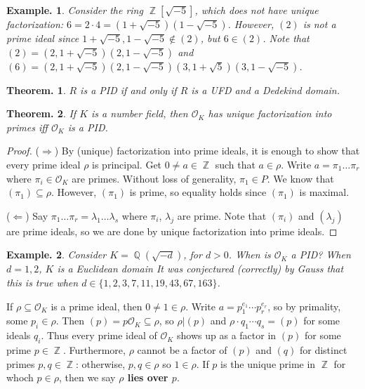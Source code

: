 \documentclass[11pt, a4paper]{memoir}
\DeclareMathOperator{\Q}{{\mathbb{Q}}}
\DeclareMathOperator{\Z}{{\mathbb{Z}}}
\theoremstyle{change}
\newtheorem{theorem}{Theorem.}[section]
\theoremstyle{plain}
\theoremstyle{nonumberplain}
\newtheorem{example}{Example.}
\newtheorem{proof}{Proof}
\numberwithin{equation}{section}
\begin{document}
\begin{example}
    Consider the ring $\Z[\sqrt{-5}]$, which does not have unique factorization: $6=2\cdot 4=(1+\sqrt{-5})(1-\sqrt{-5})$.
    However, $(2)$ is not a prime ideal since $1+\sqrt{-5},1-\sqrt{-5}\notin(2)$, but $6\in(2)$.
    Note that $(2)=(2,1+\sqrt{-5})(2,1-\sqrt{-5})$ and $(6)=(2,1+\sqrt{-5})(2,1-\sqrt{-5})(3,1+\sqrt{5})(3,1-\sqrt{-5})$.
\end{example}
\begin{theorem}
    $R$ is a PID if and only if $R$ is a UFD and a Dedekind domain.
\end{theorem}
\begin{theorem}
    If $K$ is a number field, then $\mathcal{O}_K$ has unique factorization into primes iff $\mathcal{O}_K$ is a PID.
\end{theorem}
\begin{proof}
    ($\Rightarrow$) By (unique) factorization into prime ideals, it is enough to show that every prime ideal $\rho$ is principal.
    Get $0\neq a\in\Z$ such that $a\in\rho$.
    Write $a=\pi_1\ldots\pi_r$ where $\pi_i\in\mathcal{O}_K$ are primes.
    Without loss of generality, $\pi_1\in P$.
    We know that $(\pi_1)\subseteq\rho$.
    However, $(\pi_1)$ is prime, so equality holds since $(\pi_1)$ is maximal.

    ($\Leftarrow$) Say $\pi_1\ldots\pi_r=\lambda_1\ldots\lambda_s$ where $\pi_i$, $\lambda_j$ are prime.
    Note that $(\pi_i)$ and $(\lambda_j)$ are prime ideals, so we are done by unique factorization into prime ideals.
\end{proof}
\begin{example}
    Consider $K=\Q(\sqrt{-d})$, for $d>0$.
    When is $\mathcal{O}_K$ a PID?
    When $d=1,2$, $K$ is a Euclidean domain
    It was conjectured (correctly) by Gauss that this is true when $d\in\{1,2,3,7,11,19,43,67,163\}$.
\end{example}
If $\rho\subseteq\mathcal{O}_K$ is a prime ideal, then $0\neq 1\in\rho$.
Write $a=p_1^{e_1}\cdots p_r^{e_r}$, so by primality, some $p_i\in\rho$.
Then $(p)=p\mathcal{O}_K\subseteq\rho$, so $\rho|(p)$ and $\rho\cdot q_1\cdots q_s=(p)$ for some ideals $q_i$.
Thus every prime ideal of $\mathcal{O}_K$ shows up as a factor in $(p)$ for some prime $p\in\Z$.
Furthermore, $\rho$ cannot be a factor of $(p)$ and $(q)$ for distinct primes $p,q\in\Z$: otherwise, $p,q\in\rho$ so $1\in\rho$.
If $p$ is the unique prime in $\Z$ for whoch $p\in\rho$, then we say \textbf{$\rho$ lies over $p$}.
\end{document}
